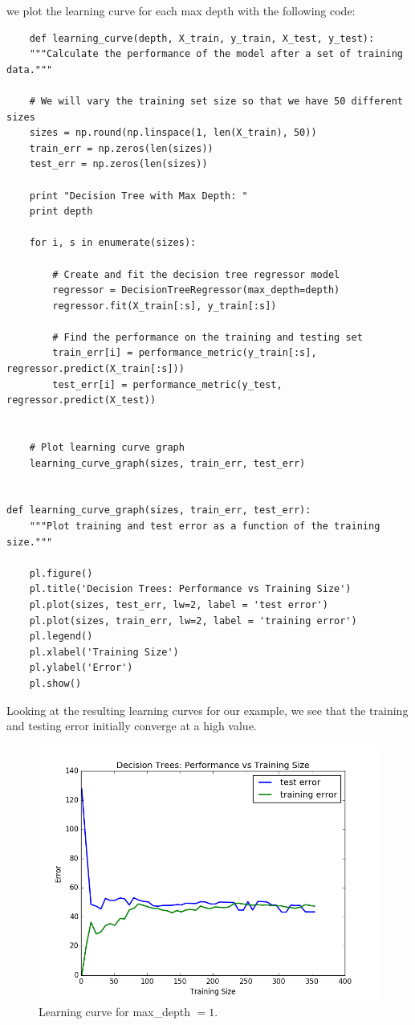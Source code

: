 \documentclass[12 pt]{article}
\numberwithin{equation}{section}
\begin{document}
we plot the learning curve for each max depth with the following code:

\begin{verbatim}
	def learning_curve(depth, X_train, y_train, X_test, y_test):
    """Calculate the performance of the model after a set of training data."""

    # We will vary the training set size so that we have 50 different sizes
    sizes = np.round(np.linspace(1, len(X_train), 50))
    train_err = np.zeros(len(sizes))
    test_err = np.zeros(len(sizes))

    print "Decision Tree with Max Depth: "
    print depth

    for i, s in enumerate(sizes):

        # Create and fit the decision tree regressor model
        regressor = DecisionTreeRegressor(max_depth=depth)
        regressor.fit(X_train[:s], y_train[:s])

        # Find the performance on the training and testing set
        train_err[i] = performance_metric(y_train[:s], regressor.predict(X_train[:s]))
        test_err[i] = performance_metric(y_test, regressor.predict(X_test))


    # Plot learning curve graph
    learning_curve_graph(sizes, train_err, test_err)


def learning_curve_graph(sizes, train_err, test_err):
    """Plot training and test error as a function of the training size."""

    pl.figure()
    pl.title('Decision Trees: Performance vs Training Size')
    pl.plot(sizes, test_err, lw=2, label = 'test error')
    pl.plot(sizes, train_err, lw=2, label = 'training error')
    pl.legend()
    pl.xlabel('Training Size')
    pl.ylabel('Error')
    pl.show()
\end{verbatim}
Looking at the resulting learning curves for our example, we see that the training and testing error initially converge at a high value. 

\begin{figure}[h]
\begin{center}
		\includegraphics[scale=0.5]{figure_1}
		\caption{Learning curve for max\_depth $= 1$.}
\end{center}
\end{figure}
\end{document}
